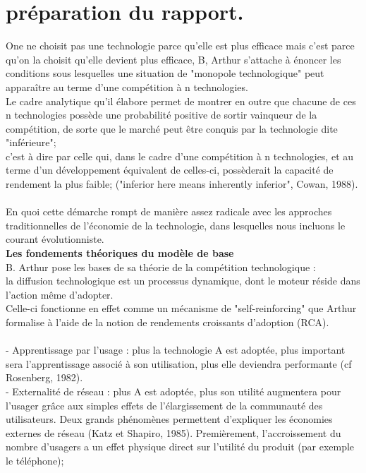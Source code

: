 \documentclass[a4paper, 10pt]{article}
\begin{document}
\section*{préparation du rapport.}
One ne choisit pas une technologie parce qu'elle est plus efficace mais c'est parce qu'on la choisit qu'elle devient plus efficace,
B, Arthur s'attache à énoncer les conditions sous lesquelles une situation de "monopole technologique" peut apparaître au terme d'une compétition à n technologies.\\
Le cadre analytique qu'il élabore permet de montrer en outre que chacune de ces n technologies possède une probabilité positive de sortir vainqueur de la compétition,
de sorte que le marché peut être conquis par la technologie dite "inférieure";\\
c'est à dire par celle qui, dans le cadre d'une compétition à n technologies,
et au terme d'un développement équivalent de celles-ci,
possèderait la capacité de rendement la plus faible;
("inferior here means inherently inferior", Cowan, 1988).\\ \\
En quoi cette démarche rompt de manière assez radicale avec les approches traditionnelles de l'économie de la technologie, dans lesquelles nous incluons le courant évolutionniste.\\
\textbf{Les fondements théoriques du modèle de base}\\
B. Arthur pose les bases de sa théorie de la compétition technologique :\\
la diffusion technologique est un processus dynamique, dont le moteur réside dans l'action même d'adopter.\\
Celle-ci fonctionne en effet comme un mécanisme de "self-reinforcing" que Arthur formalise à l'aide de la notion de rendements croissants d'adoption (RCA).\\ \\
- Apprentissage par l'usage : plus la technologie A est adoptée, plus important sera l'apprentissage associé à son utilisation, plus elle deviendra performante (cf Rosenberg, 1982).\\
- Externalité de réseau : plus A est adoptée, plus son utilité augmentera pour l'usager grâce aux simples effets de l'élargissement de la communauté des utilisateurs. Deux grands phénomènes permettent d'expliquer les économies externes de réseau (Katz et Shapiro, 1985).
Premièrement, l'accroissement du nombre d'usagers a un effet physique direct sur l'utilité du produit (par exemple le téléphone);\\
\end{document}
